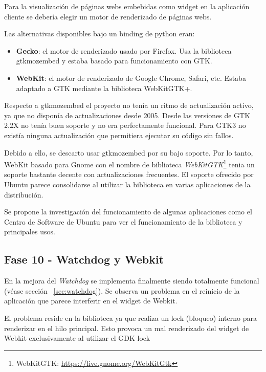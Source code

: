 Para la visualización de páginas webs embebidas como widget en la aplicación cliente
se debería elegir un motor de renderizado de páginas webs.

Las alternativas disponibles bajo un binding de python eran:

\begin{itemize}
  \item \textbf{Gecko}: el motor de renderizado usado por Firefox. Usa la
  biblioteca gtkmozembed y estaba basado para funcionamiento con GTK.
  \item \textbf{WebKit}: el motor de renderizado de Google Chrome, Safari, etc.
  Estaba adaptado a GTK mediante la biblioteca WebKitGTK+.
\end{itemize}

Respecto a gtkmozembed el proyecto no tenía un ritmo de actualización activo, ya
que no disponía de actualizaciones desde 2005. Desde las versiones de GTK 2.2X
no tenía buen soporte y no era perfectamente funcional. Para GTK3 no existía
ninguna actualización que permitiera ejecutar su código sin fallos.

Debido a ello, se descarto usar gtkmozembed por su bajo soporte. Por lo tanto,
WebKit basado para Gnome con el nombre de biblioteca
\emph{WebKitGTK}\footnote{WebKitGTK: \url{https://live.gnome.org/WebKitGtk}}
tenia un soporte bastante decente con actualizaciones frecuentes. El soporte
ofrecido por Ubuntu parece consolidarse al utilizar la biblioteca en varias 
aplicaciones de la distribución.

Se propone la investigación del funcionamiento de algunas aplicaciones como el
Centro de Software de Ubuntu para ver el funcionamiento de la biblioteca y
principales usos.

\subsection{Fase 10 - Watchdog y Webkit}

En la mejora del \emph{Watchdog} se implementa finalmente siendo totalmente
funcional (véase sección ~\ref{sec:watchdog}). Se observa un problema en el
reinicio de la aplicación que parece interferir en el widget de Webkit.

\newpage

El problema reside en la biblioteca ya que realiza un lock (bloqueo) interno
para renderizar en el hilo principal. Esto provoca un mal renderizado del widget
de Webkit exclusivamente al utilizar el \acs{GDK}\label{acro:GDK} lock

